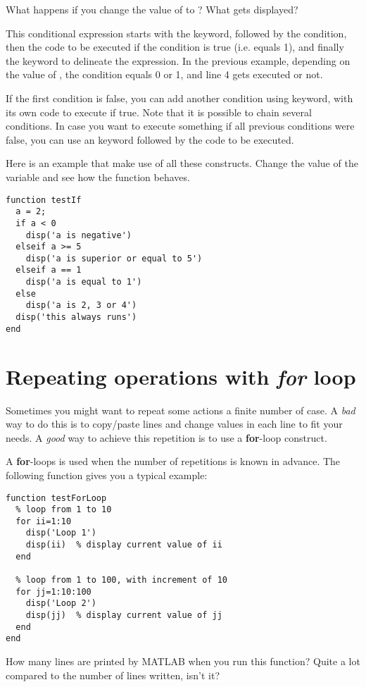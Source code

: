 \documentclass{article}
\begin{document}
What happens if you change the value of  to ?
What gets displayed?

This conditional expression starts with the  keyword, followed by the condition, then the code to be executed if the condition is true (i.e. equals 1), and finally the  keyword to delineate the expression.
In the previous example, depending on the value of , the condition  equals 0 or 1, and line 4 gets executed or not.

If the first condition is false, you can add another condition using  keyword, with its own code to execute if true.
Note that it is possible to chain several  conditions.
In case you want to execute something if all previous conditions were false, you can use an  keyword followed by the code to be executed.

Here is an example that make use of all these constructs.
Change the value of the variable  and see how the function behaves.
\begin{lstlisting}
function testIf
  a = 2;
  if a < 0
    disp('a is negative')
  elseif a >= 5
    disp('a is superior or equal to 5')
  elseif a == 1
    disp('a is equal to 1')
  else
    disp('a is 2, 3 or 4')
  disp('this always runs')
end
\end{lstlisting}


\section{Repeating operations with \emph{for} loop}

Sometimes you might want to repeat some actions a finite number of case.
A \emph{bad} way to do this is to copy/paste lines and change values in each line to fit your needs.
A \emph{good} way to achieve this repetition is to use a \textbf{for}-loop construct.

A \textbf{for}-loops is used when the number of repetitions is known in advance.
The following function gives you a typical example:
\begin{lstlisting}
function testForLoop
  % loop from 1 to 10
  for ii=1:10
    disp('Loop 1')
    disp(ii)  % display current value of ii
  end

  % loop from 1 to 100, with increment of 10
  for jj=1:10:100
    disp('Loop 2')
    disp(jj)  % display current value of jj
  end
end
\end{lstlisting}

How many lines are printed by MATLAB when you run this function?
Quite a lot compared to the number of lines written, isn't it?
\end{document}
